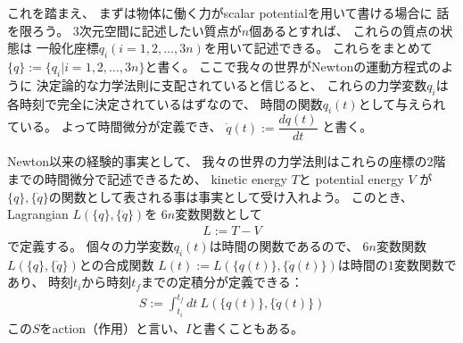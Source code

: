 これを踏まえ、
まずは物体に働く力がscalar potentialを用いて書ける場合に
話を限ろう。
3次元空間に記述したい質点が$n$個あるとすれば、
これらの質点の状態は
一般化座標$q_i$$(i=1,2,\dots,3n)$を用いて記述できる。
これらをまとめて$\{q\} := \{q_i| i=1,2,\dots,3n\}$と書く。
ここで我々の世界がNewtonの運動方程式のように
決定論的な力学法則に支配されていると信じると、
これらの力学変数$q_i$は各時刻で完全に決定されているはずなので、
時間の関数$q_i(t)$として与えられている。
よって時間微分が定義でき、
$\dot{q}(t) := \dfrac{dq(t)}{dt}$
と書く。

Newton以来の経験的事実として、
我々の世界の力学法則はこれらの座標の2階までの時間微分で記述できるため、
kinetic energy $T$と
potential energy $V$
が
$\{q\}, \{\dot{q}\}$の関数として表される事は事実として受け入れよう。
このとき、Lagrangian $L(\{q\}, \{\dot{q}\})$を
$6n$変数関数として
\begin{align}
  L := T - V
\end{align}
で定義する。
個々の力学変数$q_i(t)$は時間の関数であるので、
$6n$変数関数
$L(\{q\}, \{\dot{q}\})$との合成関数
$L(t) := L(\{q(t)\}, \{\dot{q}(t)\})$は時間の$1$変数関数であり、
時刻$t_i$から時刻$t_f$までの定積分が定義できる：
\begin{align}
  S := \int_{t_i}^{t_f}dt\ L(\{q(t)\}, \{\dot{q}(t)\})
\end{align}
この$S$をaction（作用）と言い、$I$と書くこともある。

